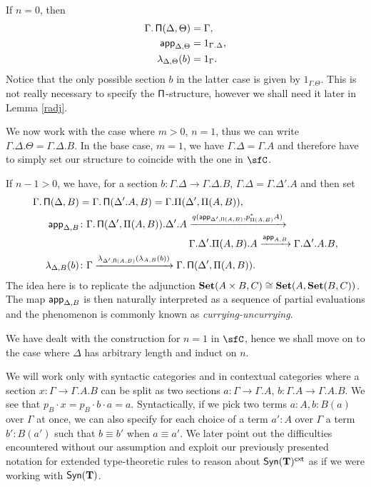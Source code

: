 \begin{construction}[Part 1]
  If $n=0$, then
  \begin{align*}
    \Gamma.\operatorname{\mathsf{\Pi}}(\Delta,\Theta) &=\Gamma, \\
    \operatorname{\mathsf{app}}_{\Delta,\Theta} &=1_{\Gamma.\Delta}, \\
    \lambda_{\Delta,\Theta}(b) &=1_\Gamma.
  \end{align*}
  Notice that the only possible section $b$ in the latter case is given by
  $1_{\Gamma.\Theta}$. This is not really necessary to specify the
  $\operatorname{\mathsf{\Pi}}$-structure, however we shall need it later in Lemma \ref{radj}.

  We now work with the case where $m>0$, $n=1$, thus we can write
  $\Gamma.\Delta.\Theta=\Gamma.\Delta.B$. In the base case, $m=1$, we have
  $\Gamma.\Delta=\Gamma.A$ and therefore have to simply set our structure to
  coincide with the one in $\sfC$.

  If $n-1>0$, we have, for a section
  $b\colon\Gamma.\Delta\rightarrow\Gamma.\Delta.B$,
  $\Gamma.\Delta=\Gamma.\Delta'.A$ and then set
  \begin{align*}
    \Gamma.\operatorname{\mathsf{\Pi}}(\Delta,B)
    &=\Gamma.\operatorname{\mathsf{\Pi}}(\Delta'.A,B)=\Gamma.\Pi(\Delta',\Pi(A,B)), \\
    \operatorname{\mathsf{app}}_{\Delta,B}
    &\colon
    \Gamma.\operatorname{\mathsf{\Pi}}(\Delta',\Pi(A,B)).\Delta'.A
                    \xrightarrow{q(\operatorname{\mathsf{app}}_{\Delta',\operatorname{\mathsf{\Pi}}(A,B)},p^*_{\Pi(A,B)}A)} \\
    &\quad\quad\quad\quad\quad\quad\quad\quad\quad\quad\quad
    \Gamma.\Delta'.\Pi(A,B).A
    \xrightarrow{\operatorname{\mathsf{app}}_{A,B}}
    \Gamma.\Delta'.A.B, \\
    \lambda_{\Delta,B}(b)
    &\colon
    \Gamma
    \xrightarrow{\lambda_{\Delta',\operatorname{\mathsf{\Pi}}(A,B)}(\lambda_{A,B}(b))}
    \Gamma.\operatorname{\mathsf{\Pi}}(\Delta',\Pi(A,B)).
  \end{align*}
  The idea here is to replicate the adjunction $\operatorname{\mathbf{Set}}(A\times
  B,C)\cong\operatorname{\mathbf{Set}}(A,\operatorname{\mathbf{Set}}(B,C))$. The map $\operatorname{\mathsf{app}}_{\Delta,B}$ is then naturally
  interpreted as a sequence of partial evaluations and the phenomenon is
  commonly known as \emph{currying-uncurrying}.
\end{construction}

  We have dealt with the construction for $n=1$ in $\sfC$, hence we shall move
  on to the case where $\Delta$ has arbitrary length and induct on $n$.

We will work only with syntactic categories and in contextual categories where a
section $x\colon\Gamma\rightarrow\Gamma.A.B$ can be split as
two sections $a\colon\Gamma\rightarrow\Gamma.A$,
$b\colon\Gamma.A\rightarrow\Gamma.A.B$.
We see that $p_B\cdot x=p_B\cdot b\cdot a=a$. Syntactically, if
we pick two terms $a:A,b:B(a)$ over $\Gamma$ at once, we can also
specify for each choice of a term $a':A$ over $\Gamma$ a term $b':B(a')$ such
that $b\equiv b'$ when $a\equiv a'$. We later point out the
difficulties encountered without our assumption and exploit our previously
presented notation for extended type-theoretic rules to reason about
$\mathsf{Syn}(\mathbf{T})^{\operatorname{\mathsf{cxt}}}$ as if we were working with $\mathsf{Syn}(\mathbf{T})$.


